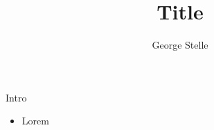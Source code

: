 \documentclass[final]{beamer}
\title{Title}
\author{George Stelle}
\institute{University of New Mexico}
\begin{document}
\begin{frame}[fragile]
\titlepage
\end{frame}
\begin{frame}{Intro}
\begin{itemize}
\item Lorem
\end{itemize}
\end{frame}
\end{document}
